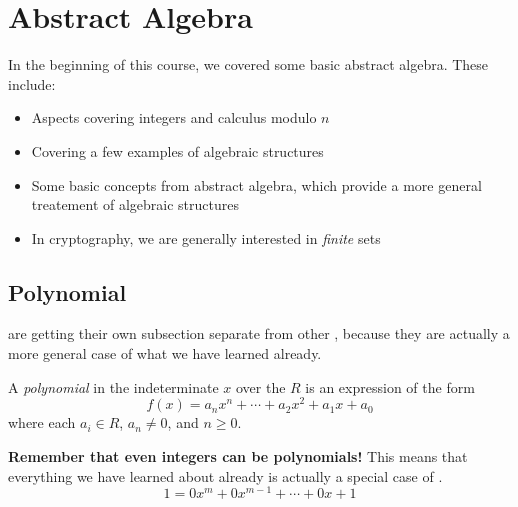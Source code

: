 \section{Abstract Algebra}\label{sec:Abstract_Algebra}
In the beginning of this course, we covered some basic abstract algebra.
These include:
\begin{itemize}[noitemsep]
\item Aspects covering integers and calculus modulo $n$
\item Covering a few examples of algebraic structures
\item Some basic concepts from abstract algebra, which provide a more general treatement of algebraic structures
\item In cryptography, we are generally interested in \emph{finite} sets
\end{itemize}









\subsection{Polynomial }\label{subsec:Polynomial_Rings}
 are getting their own subsection separate from other , because they are actually a more general case of what we have learned already.
\begin{definition}[Polynomial]\label{def:Polynomial}
  A \emph{polynomial} in the indeterminate $x$ over the  $R$ is an expression of the form
  \begin{equation}\label{eq:Polynomial_Ring}
    f(x) = a_{n}x^{n} + \cdots + a_{2}x^{2} + a_{1}x + a_{0}
  \end{equation}
  where each $a_{i} \in R$, $a_{n} \neq 0$, and $n \geq 0$.

  \begin{remark}
    \textbf{Remember that even integers can be polynomials!}
    This means that everything we have learned about  already is actually a special case of .
    \begin{equation*}
      1 = 0x^{m} + 0x^{m-1} + \cdots + 0x + 1
    \end{equation*}
  \end{remark}
\end{definition}

